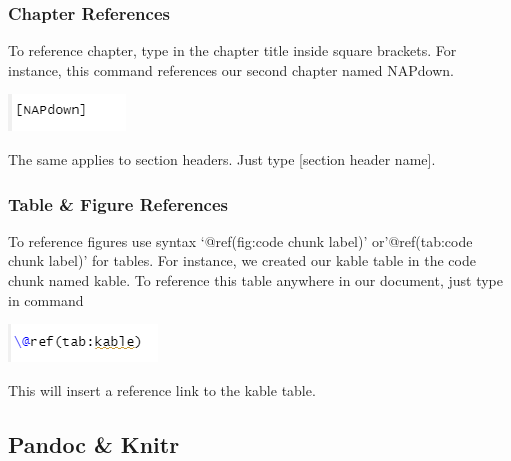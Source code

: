 \documentclass[
]{book}
\let\origfigure\figure
\let\endorigfigure\endfigure
\renewenvironment{figure}[1][2] {
    \expandafter\origfigure\expandafter[H]
} {
    \endorigfigure
}
\begin{document}
\hypertarget{chapter-references}{%
\subsubsection{Chapter References}\label{chapter-references}}

To reference chapter, type in the chapter title inside square brackets. For instance, this command references our second chapter named NAPdown.

\begin{figure}
\centering
\includegraphics{tutorial_screenshots/ref_chapters_sections.png}
\caption{chapter ref}
\end{figure}

The same applies to section headers. Just type {[}section header name{]}.

\hypertarget{table-figure-references}{%
\subsubsection{Table \& Figure References}\label{table-figure-references}}

To reference figures use syntax `@ref(fig:code chunk label)' or'@ref(tab:code chunk label)' for tables.
For instance, we created our kable table in the code chunk named kable. To reference this table anywhere in our document, just type in command

\begin{figure}
\centering
\includegraphics{tutorial_screenshots/ref_table.png}
\caption{Ref table}
\end{figure}

This will insert a reference link to the kable table.

\hypertarget{pandoc-knitr}{%
\subsection{Pandoc \& Knitr}\label{pandoc-knitr}}
\end{document}
